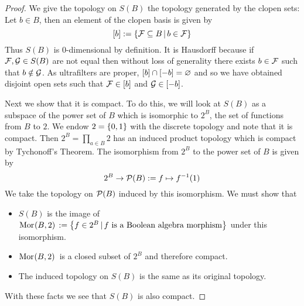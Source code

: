 \begin{proof}
    We give the topology on $S(B)$ the topology generated by the clopen sets:
    Let $b \in B$, 
    then an element of the clopen basis is given by
    \[[b] := \left\{\mathcal{F} \subseteq B \,|\, b \in \mathcal{F}\right\}\]
    Thus $S(B)$ is $0$-dimensional by definition.
    It is Hausdorff because if $\mathcal{F}, \mathcal{G} \in S(B)$ are not equal then 
    without loss of generality there exists $b \in \mathcal{F}$ such that 
    $b \notin \mathcal{G}$. 
    As ultrafilters are proper, $[b] \cap [- b] = \varnothing$ and so
    we have obtained disjoint open sets such that 
    $\mathcal{F} \in [b]$ and $\mathcal{G} \in [- b]$.
    
    Next we show that it is compact. 
    To do this, 
    we will look at $S(B)$ as a subspace of the power set of $B$
    which is isomorphic to
    $2^B$, 
    the set of functions from $B$ to $2$.
    We endow $2 = \left\{0,1\right\}$ with the discrete topology and note that it is 
    compact.
    Then $2^B = \prod_{a \in B} 2$ has an induced product topology which is 
    compact by Tychonoff's Theorem.
    The isomorphism from $2^B$ to the power set of $B$ is given by 
    \[2^B \to \mathcal{P}(B) := f \mapsto f^{-1}(1)\]
    We take the topology on $\mathcal{P}(B)$ induced by this isomorphism.
    We must show that 
    \begin{itemize}
        \item $S(B)$ is the image of 
            $\mathrm{Mor}_{}(B, 2)\, := 
            \left\{f \in 2^B \,|\, f \text{ is a Boolean algebra morphism}\right\}$
            under this isomorphism.
        \item $\mathrm{Mor}_{}(B, 2)\,$ is a closed subset of $2^B$ and therefore
            compact.
        \item The induced topology on $S(B)$ 
            is the same as its original topology.
    \end{itemize}
    With these facts we see that $S(B)$ is also compact.


\end{proof}
